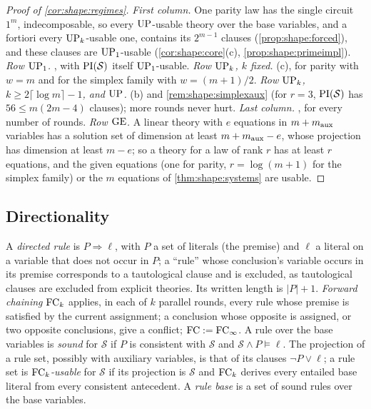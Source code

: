 \begin{proof}[Proof of \cref{cor:shape:regimes}]
\emph{First column.} One parity law has the single circuit $1^m$, indecomposable, so every $\mathrm{UP}$-usable theory over the base variables, and a fortiori every $\mathrm{UP}_k$-usable one, contains its $2^{m-1}$ clauses (\cref{prop:shape:forced}), and these clauses are $\mathrm{UP}_1$-usable (\cref{cor:shape:core}(c), \cref{prop:shape:primeimpl}). \emph{Row $\mathrm{UP}_1$.} , with $\mathrm{PI}(\mathcal S)$ itself $\mathrm{UP}_1$-usable. \emph{Row $\mathrm{UP}_k$, $k$ fixed.} (c), for parity with $w=m$ and for the simplex family with $w=(m+1)/2$. \emph{Row $\mathrm{UP}_k$, $k\ge2\lceil\log m\rceil-1$, and $\mathrm{UP}$.} (b) and \cref{rem:shape:simplexaux} (for $r=3$, $\mathrm{PI}(\mathcal S)$ has $56\le m(2m-4)$ clauses); more rounds never hurt. \emph{Last column.} , for every number of rounds. \emph{Row $\mathrm{GE}$.} A linear theory with $e$ equations in $m+m_{\rm aux}$ variables has a solution set of dimension at least $m+m_{\rm aux}-e$, whose projection has dimension at least $m-e$; so a theory for a law of rank $r$ has at least $r$ equations, and the given equations (one for parity, $r=\log(m+1)$ for the simplex family) or the $m$ equations of \cref{thm:shape:systems} are usable.
\end{proof}

\subsection{Directionality}\label{app:shape:directions}

A \emph{directed rule} is $P\Rightarrow\ell$, with $P$ a set of literals (the premise) and $\ell$ a literal on a variable that does not occur in $P$; a ``rule'' whose conclusion's variable occurs in its premise corresponds to a tautological clause and is excluded, as tautological clauses are excluded from explicit theories. Its written length is $\lvert P\rvert+1$. \emph{Forward chaining} $\mathrm{FC}_k$ applies, in each of $k$ parallel rounds, every rule whose premise is satisfied by the current assignment; a conclusion whose opposite is assigned, or two opposite conclusions, give a conflict; $\mathrm{FC}:=\mathrm{FC}_\infty$. A rule over the base variables is \emph{sound} for $\mathcal S$ if $P$ is consistent with $\mathcal S$ and $\mathcal S\wedge P\models\ell$. The projection of a rule set, possibly with auxiliary variables, is that of its clauses $\neg P\vee\ell$; a rule set is \emph{$\mathrm{FC}_k$-usable} for $\mathcal S$ if its projection is $\mathcal S$ and $\mathrm{FC}_k$ derives every entailed base literal from every consistent antecedent. A \emph{rule base} is a set of sound rules over the base variables.

